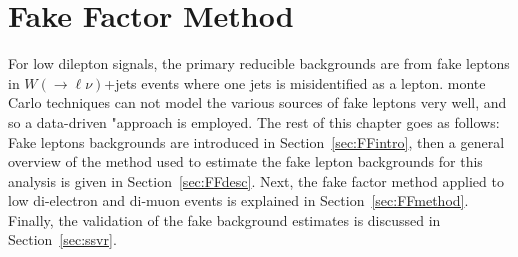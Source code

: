 \chapter{Fake Factor Method}
\label{ch:fakefactor}
 For low \pt dilepton signals, the primary reducible backgrounds are from fake leptons in $W(\rightarrow\ell\nu)$+jets events where one jets is misidentified as a lepton.   monte Carlo techniques can not model the various sources of fake leptons very well, and so a data-driven "approach is employed.  The rest of this chapter goes as follows:  Fake leptons backgrounds are introduced in Section~\ref{sec:FFintro}, then a general overview of the method used to estimate the fake lepton backgrounds for this analysis is given in Section~\ref{sec:FFdesc}.  Next, the fake factor method applied to low \pt{} di-electron and di-muon events is explained in Section~\ref{sec:FFmethod}.  Finally, the validation of the fake background estimates is discussed in Section~\ref{sec:ssvr}.%

